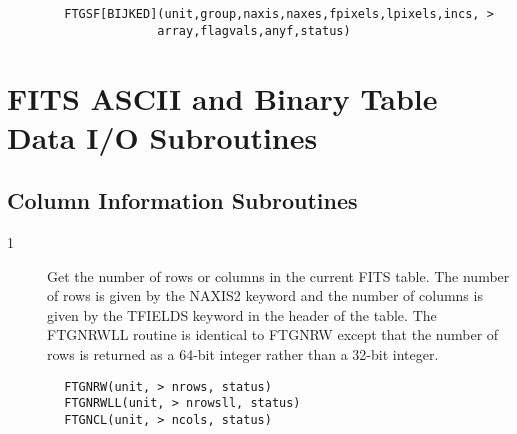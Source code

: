 \documentclass[11pt]{book}
\begin{document}
\begin{verbatim}
        FTGSF[BIJKED](unit,group,naxis,naxes,fpixels,lpixels,incs, >
                     array,flagvals,anyf,status)
\end{verbatim}


\section{FITS ASCII and Binary Table Data I/O Subroutines}


\subsection{Column Information Subroutines \label{FTGCNO}}


\begin{description}
\item[1 ]  Get the number of rows or columns in the current FITS table.
     The number of rows is given by the NAXIS2 keyword and the
     number of columns is given by the TFIELDS keyword in the header
     of the table.  The FTGNRWLL routine is identical to FTGNRW except
     that the number of rows is returned as a 64-bit integer rather
    than a 32-bit integer.
\end{description}

\begin{verbatim}
        FTGNRW(unit, > nrows, status)
        FTGNRWLL(unit, > nrowsll, status)
        FTGNCL(unit, > ncols, status)
\end{verbatim}
\end{document}
